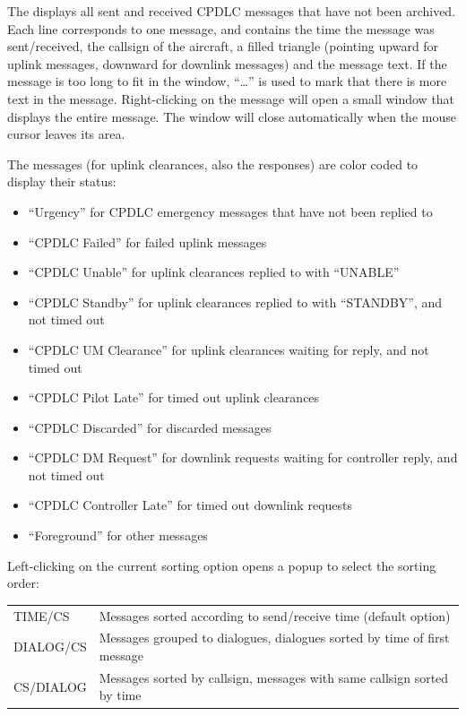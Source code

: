 \documentclass[11pt,a4paper]{memoir}
\begin{document}
The \textit{} displays all sent and received CPDLC messages that have not been archived. Each line corresponds to one message, and contains the time the message was sent/received, the callsign of the aircraft, a filled triangle (pointing upward for uplink messages, downward for downlink messages) and the message text. If the message is too long to fit in the window, “…” is used to mark that there is more text in the message. Right-clicking on the message will open a small window that displays the entire message. The window will close automatically when the mouse cursor leaves its area.

The messages (for uplink clearances, also the responses) are color coded to display their status:

\begin{itemize}
    \item “Urgency” for CPDLC emergency messages that have not been replied to
    \item “CPDLC Failed” for failed uplink messages
    \item “CPDLC Unable” for uplink clearances replied to with “UNABLE”
    \item “CPDLC Standby” for uplink clearances replied to with “STANDBY”, and not timed out
    \item “CPDLC UM Clearance” for uplink clearances waiting for reply, and not timed out
    \item “CPDLC Pilot Late” for timed out uplink clearances
    \item “CPDLC Discarded” for discarded messages
    \item “CPDLC DM Request” for downlink requests waiting for controller reply, and not timed out
    \item “CPDLC Controller Late” for timed out downlink requests
    \item “Foreground” for other messages
\end{itemize}

Left-clicking on the current sorting option opens a popup to select the sorting order:

\begin{tabular}{l l}
    TIME/CS     & Messages sorted according to send/receive time (default option)\\
    DIALOG/CS   & Messages grouped to dialogues, dialogues sorted by time of first message\\
    CS/DIALOG   & Messages sorted by callsign, messages with same callsign sorted by time\\
\end{tabular}
\end{document}
